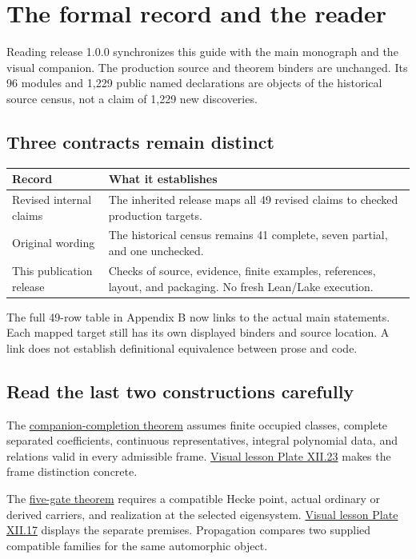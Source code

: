 \section*{The formal record and the reader}
Reading release 1.0.0 synchronizes this guide with the main monograph and the visual companion. The production source and theorem binders are unchanged. Its 96 modules and 1,229 public named declarations are objects of the historical source census, not a claim of 1,229 new discoveries.

\subsection*{Three contracts remain distinct}
\begin{center}\begin{tabular}{>{\raggedright\arraybackslash}p{.28\linewidth}>{\raggedright\arraybackslash}p{.62\linewidth}}\toprule
Record & What it establishes\\\midrule
Revised internal claims & The inherited release maps all 49 revised claims to checked production targets.\\
Original wording & The historical census remains 41 complete, seven partial, and one unchecked.\\
This publication release & Checks of source, evidence, finite examples, references, layout, and packaging. No fresh Lean/Lake execution.\\\bottomrule
\end{tabular}\end{center}
The full 49-row table in Appendix B now links to the actual main statements. Each mapped target still has its own displayed binders and source location. A link does not establish definitional equivalence between prose and code.

\subsection*{Read the last two constructions carefully}
The \href{p12-route:lean-completion}{companion-completion theorem} assumes finite occupied classes, complete separated coefficients, continuous representatives, integral polynomial data, and relations valid in every admissible frame. \href{p12-route:lean-visual23}{Visual lesson Plate XII.23} makes the frame distinction concrete.

The \href{p12-route:lean-five}{five-gate theorem} requires a compatible Hecke point, actual ordinary or derived carriers, and realization at the selected eigensystem. \href{p12-route:lean-visual17}{Visual lesson Plate XII.17} displays the separate premises. Propagation compares two supplied compatible families for the same automorphic object.

